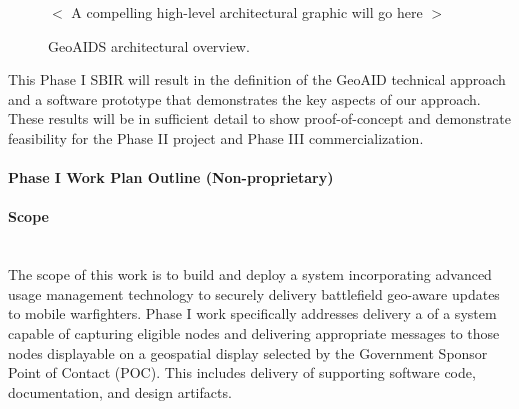 \documentclass{sbir}
\begin{document}

\begin{figure}
 \vspace{1in}
 \begin{center}
  $<$ A compelling high-level architectural graphic will go here $>$
  \end{center}
 \vspace{1in}
  \caption{GeoAIDS architectural overview.}\label{GeoAIDarch}
 \end{figure}

{This Phase I SBIR will result in the definition of the GeoAID technical approach and a software prototype that demonstrates the key aspects of our approach. These results will be in sufficient detail to show proof-of-concept and demonstrate feasibility for the Phase II project and Phase III commercialization.}

\newpage 
\pagestyle{nonproprietary}

\paragraph{Phase I Work Plan Outline (Non-proprietary)}
\paragraph{Scope}~\\
The scope of this work is to build and deploy a system incorporating advanced usage management technology to securely delivery battlefield geo-aware updates to mobile warfighters. Phase I work specifically addresses delivery a of a system capable of capturing eligible nodes and delivering appropriate messages to those nodes displayable on a geospatial display selected by the Government Sponsor Point of Contact (POC). This includes delivery of supporting software code, documentation, and design artifacts.
\end{document}
